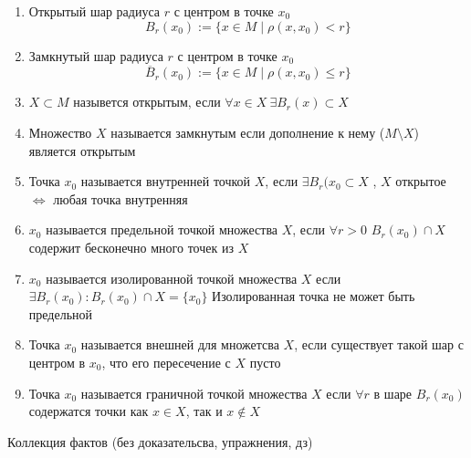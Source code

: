 \documentclass[14pt]{extarticle}
\begin{document}
 \begin{enumerate}
	 \item Открытый шар радиуса $r$ с центром в точке $x_0$
		 \begin{equation}
		 	B_{r}(x_0) := 
			\{x \in M \mid \rho(x,x_0) < r\}
		 \end{equation}
	
	 \item Замкнутый шар радиуса $r$ с центром в точке $x_0$
		 \begin{equation}
		 	\overline{B}_{r}(x_0) := 
			\{x \in M \mid \rho(x,x_0) \le  r\}
		 \end{equation}
	\item $X \subset M$ назывется открытым, если  $\forall x \in X ~\exists B_{r}(x) \subset X$ 
	\item Множество $X$ называется замкнутым если дополнение к нему ($M \setminus X$) является открытым
	\item Точка $x_0$ называется внутренней точкой $X$, если $\exists  B_{r}(x_{0} \subset X$ ,  $X$ открытое  $\iff$ любая точка внутренняя
	\item $x_0$ называется предельной точкой множества $X$,
		если  $\forall  r > 0$ $B_{r}(x_0) \cap X$ содержит
		бесконечно много точек из $X$
        \item $x_0$ называется изолированной точкой множества
		$X$  если  $\exists  B_{r}(x_0): B_{r}(x_0) \cap X = \{x_0\}$
	Изолированная точка не может быть предельной
	\item Точка $x_0$ называется внешней для множетсва $X$,
		если существует такой шар с центром в  $x_0$,
		что его пересечение с $X$ пусто
	\item Точка $x_0$ называется граничной точкой множества $X$ 
		если  $\forall r$ в шаре $B_{r}(x_0)$ содержатся
		точки как $x \in X$, так и $x \notin X$
\end{enumerate}
Коллекция фактов (без доказательсва, упражнения, дз)
\end{document}
